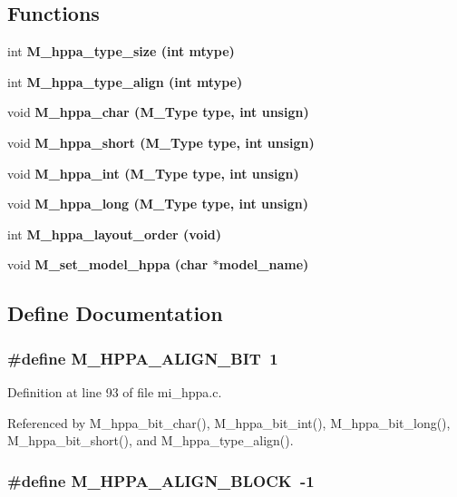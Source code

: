 \subsection*{Functions}
\begin{CompactItemize}
\item 
int \bf{M\_\-hppa\_\-type\_\-size} (int mtype)
\item 
int \bf{M\_\-hppa\_\-type\_\-align} (int mtype)
\item 
void \bf{M\_\-hppa\_\-char} (\bf{M\_\-Type} type, int unsign)
\item 
void \bf{M\_\-hppa\_\-short} (\bf{M\_\-Type} type, int unsign)
\item 
void \bf{M\_\-hppa\_\-int} (\bf{M\_\-Type} type, int unsign)
\item 
void \bf{M\_\-hppa\_\-long} (\bf{M\_\-Type} type, int unsign)
\item 
int \bf{M\_\-hppa\_\-layout\_\-order} (void)
\item 
void \bf{M\_\-set\_\-model\_\-hppa} (char $\ast$model\_\-name)
\end{CompactItemize}


\subsection{Define Documentation}
\subsubsection{\setlength{\rightskip}{0pt plus 5cm}\#define M\_\-HPPA\_\-ALIGN\_\-BIT~1}\label{mi__hppa_8c_5b5309035fe85cab789f8bce3309260c}




Definition at line 93 of file mi\_\-hppa.c.

Referenced by M\_\-hppa\_\-bit\_\-char(), M\_\-hppa\_\-bit\_\-int(), M\_\-hppa\_\-bit\_\-long(), M\_\-hppa\_\-bit\_\-short(), and M\_\-hppa\_\-type\_\-align().
\subsubsection{\setlength{\rightskip}{0pt plus 5cm}\#define M\_\-HPPA\_\-ALIGN\_\-BLOCK~-1}\label{mi__hppa_8c_81a27c8d35cc684353c60be1082cd0f9}





